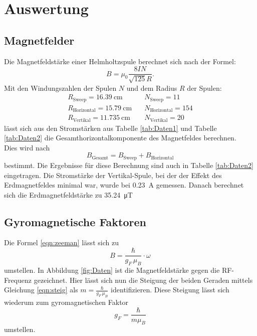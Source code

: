 \section{Auswertung}
	

	\subsection{Magnetfelder}
		
		\noindent
		Die Magnetfeldstärke einer Helmholtzspule berechnet sich nach der Formel:
		\begin{equation}
			B = \mu_0 \frac{8IN}{\sqrt{125}R}.
		\end{equation}		
		Mit den Windungszahlen der Spulen $N$ und dem Radius $R$ der Spulen:
		\begin{align*}
			R_\text{Sweep} = \SI{16.39}{\centi\metre}			\quad   &N_\text{Sweep}    = 11		\\
			R_\text{Horizontal} = \SI{15.79}{\centi\metre}		\quad 	&N_\text{Horizontal} = 154  \\
			R_\text{Vertikal} = \SI{11.735}{\centi\metre}		\quad	&N_\text{Vertikal} = 20
		\end{align*}
		lässt sich aus den Stromstärken aus Tabelle \ref{tab:Daten1} und Tabelle \ref{tab:Daten2} die Gesamthorizontalkomponente des Magnetfeldes berechnen.\\
		Dies wird nach
		\begin{equation*}
			B_\text{Gesamt} = B_\text{Sweep} + B_\text{Horizontal}
		\end{equation*} 
		bestimmt. Die Ergebnisse für diese Berechnung sind auch in Tabelle \ref{tab:Daten2} eingetragen.
		Die Stromstärke der Vertikal-Spule, bei der der Effekt des Erdmagnetfeldes minimal war, wurde bei \SI{0.23}{\ampere} gemessen.
		Danach berechnet sich die Erdmagnetfeldstärke zu \SI{35.24}{\micro\tesla}
		
	\subsection{Gyromagnetische Faktoren}
		
		\noindent
		Die Formel \ref{eqn:zeeman} lässt sich zu 
		\begin{equation*}
			B = \frac{\hbar}{g_F \, \mu_B} \cdot \omega
			\label{eqn:steig}
		\end{equation*}
		umstellen. In Abbildung \ref{fig:Daten} ist die Magnetfeldstärke gegen die RF-Frequenz gezeichnet.
		Hier lässt sich nun die Steigung der beiden Geraden mittels Gleichung \ref{eqn:steig} als $ m = \frac{\hbar}{g_F \, \mu_B}$ identifizieren.		
		Diese Steigung lässt sich wiederum zum gyromagnetischen Faktor
		\begin{equation}
		 	g_F = \frac{\hbar}{m \mu_B}
			\label{eqn:gyro}
		\end{equation}
		umstellen.		

